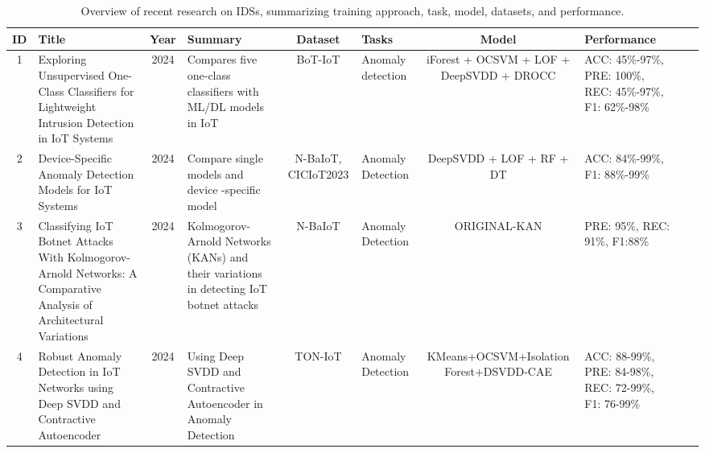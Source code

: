 \documentclass[final,twocolumn,10pt]{elsarticle}
\begin{document}
\begin{table}[!H] %
\centering
\caption{Overview of recent research on IDSs, summarizing training approach, task, model, datasets, and performance.}
\label{tab:ids_overview}
\renewcommand{\arraystretch}{2.1} %
\scriptsize %
\setlength{\tabcolsep}{4pt} %

\begin{adjustbox}{width=1\textwidth,center} %
\begin{tabular}{@{}c>{\centering\arraybackslash}m{3.5cm}c>{\arraybackslash}m{4.8cm}c>{\centering\arraybackslash}m{2.8cm}c>{\centering\arraybackslash}m{2.5cm}c>{\centering\arraybackslash}m{3.2cm}@{}}
\toprule
\textbf{ID} & \textbf{Title} & \textbf{Year} & \textbf{Summary} & \textbf{Dataset} & \textbf{Tasks} & \textbf{Model} & \textbf{Performance} \\ 
\midrule    

1 & Exploring Unsupervised One-Class Classifiers for Lightweight Intrusion Detection in IoT Systems\cite{golestani2024exploring}& 2024 & Compares five one-class classifiers with ML/DL models in IoT & BoT-IoT & Anomaly detection & iForest + OCSVM + LOF + DeepSVDD + DROCC & ACC: 45\%-97\%, PRE: 100\%, REC: 45\%-97\%, F1: 62\%-98\% \\

2 & Device-Specific Anomaly Detection Models for IoT Systems\cite{golestani2024device} & 2024 & Compare single models and device -specific model & N-BaIoT, CICIoT2023 & Anomaly Detection & DeepSVDD + LOF + RF + DT & ACC: 84\%-99\%, F1: 88\%-99\% \\

3 & Classifying IoT Botnet Attacks With Kolmogorov-Arnold Networks: A Comparative Analysis of Architectural Variations \cite{10839389}
 & 2024 & Kolmogorov-Arnold Networks (KANs) and their variations in detecting IoT botnet attacks & N-BaIoT &  Anomaly Detection & ORIGINAL-KAN & PRE: 95\%, REC: 91\%, F1:88\%\\

4 &Robust Anomaly Detection in IoT Networks using Deep SVDD and Contractive Autoencoder\cite{aktar2024robust} & 2024 & Using Deep SVDD and Contractive Autoencoder in Anomaly Detection
 & TON-IoT &  Anomaly Detection & KMeans+OCSVM+Isolation Forest+DSVDD-CAE & ACC: 88-99\%, PRE: 84-98\%, REC: 72-99\%, F1: 76-99\% \\


\end{tabular}
\end{adjustbox}
\end{table}
\end{document}

